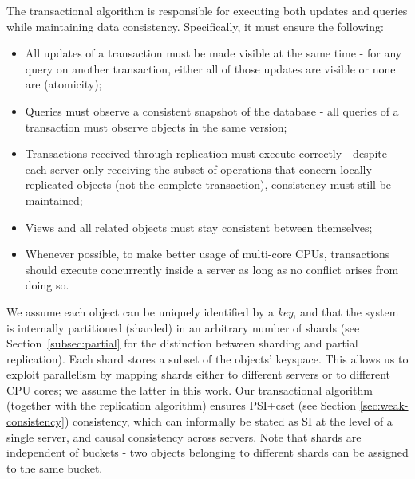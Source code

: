 The transactional algorithm is responsible for executing both updates and queries while maintaining data consistency.
Specifically, it must ensure the following:
\begin{itemize}
	\item All updates of a transaction must be made visible at the same time - for any query on another transaction, either all of those updates are visible or none are (atomicity);
	\item Queries must observe a consistent snapshot of the database - all queries of a transaction must observe objects in the same version;
	\item Transactions received through replication must execute correctly - despite each server only receiving the subset of operations that concern locally replicated objects (not the complete transaction), consistency must still be maintained;	%
	\item Views and all related objects must stay consistent between themselves;
	\item Whenever possible, to make better usage of multi-core CPUs, transactions should execute concurrently inside a server as long as no conflict arises from doing so.
\end{itemize}


We assume each object can be uniquely identified by a \emph{key}, and that the system is internally partitioned (sharded) in an arbitrary number of shards (see Section~\ref{subsec:partial} for the distinction between sharding and partial replication).
Each shard stores a subset of the objects' keyspace.
This allows us to exploit parallelism by mapping shards either to different servers or to different CPU cores; we assume the latter in this work.
Our transactional algorithm (together with the replication algorithm) ensures PSI+cset (see Section \ref{sec:weak-consistency}) consistency, which can informally be stated as SI at the level of a single server, and causal consistency across servers.
Note that shards are independent of buckets - two objects belonging to different shards can be assigned to the same bucket.

